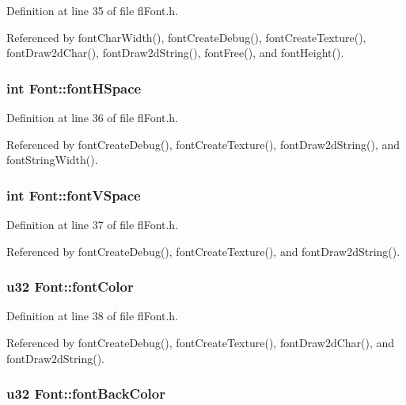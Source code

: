 Definition at line 35 of file fl\-Font.h.

Referenced by font\-Char\-Width(), font\-Create\-Debug(), font\-Create\-Texture(), font\-Draw2d\-Char(), font\-Draw2d\-String(), font\-Free(), and font\-Height().
\subsubsection{\setlength{\rightskip}{0pt plus 5cm}int {\bf Font::font\-HSpace}}\label{structFont_2b8046eb558457735d03eecffff2892c}




Definition at line 36 of file fl\-Font.h.

Referenced by font\-Create\-Debug(), font\-Create\-Texture(), font\-Draw2d\-String(), and font\-String\-Width().
\subsubsection{\setlength{\rightskip}{0pt plus 5cm}int {\bf Font::font\-VSpace}}\label{structFont_1fc2cd173a375811b58a0e783527be0a}




Definition at line 37 of file fl\-Font.h.

Referenced by font\-Create\-Debug(), font\-Create\-Texture(), and font\-Draw2d\-String().
\subsubsection{\setlength{\rightskip}{0pt plus 5cm}u32 {\bf Font::font\-Color}}\label{structFont_749f6803de52746718fc657a0fc1706b}




Definition at line 38 of file fl\-Font.h.

Referenced by font\-Create\-Debug(), font\-Create\-Texture(), font\-Draw2d\-Char(), and font\-Draw2d\-String().
\subsubsection{\setlength{\rightskip}{0pt plus 5cm}u32 {\bf Font::font\-Back\-Color}}\label{structFont_c822d07878de3cc0b94cedd2ce614025}




